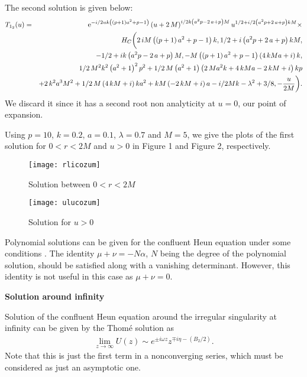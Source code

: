 \documentclass{article}
\begin{document}
The second solution is given below:
\begin{eqnarray}
T_{1_2}(u) &=&{{\rm e}^{-i/2uk \left(  \left( p+1 \right) {a}^{2}+p-1 \right) }}
 \left( u+2\,M \right) ^{i/2k \left( {a}^{2}p-2\,a+p \right) M}{u}^{1/
2+i/2 \left( {a}^{2}p+2\,a+p \right) kM} \times \\ \nonumber
&& {H_C} \bigg( 2\,iM
 \left(  \left( p+1 \right) {a}^{2}+p-1 \right) k,1/2+i \left( {a}^{2}
p+2\,a+p \right) kM, \\ \nonumber
&&-1/2+ik \left( {a}^{2}p-2\,a+p \right) M,-M
 \left(  \left( p+1 \right) {a}^{2}+p-1 \right)  \left( 4\,kMa+i
 \right) k, \\ \nonumber
&& 1/2\,{M}^{2}{k}^{2} \left( {a}^{2}+1 \right) ^{2}{p}^{2}+1/
2\,M \left( {a}^{2}+1 \right)  \left( 2\,M{a}^{2}k+4\,kMa-2\,kM+i
 \right) kp \\ \nonumber
&& +2\,{k}^{2}{a}^{3}{M}^{2}+1/2\,M \left( 4\,kM+i \right) k{a
}^{2}+kM \left( -2\,kM+i \right) a-i/2Mk-{\lambda}^{2}+3/8,-{\frac {u}{2M}} \bigg). \nonumber
\end{eqnarray}
We discard it since it has a second root non analyticity at $u=0$,
our point of expansion.

Using $p=10$, $k=0.2$, $a=0.1$, $\lambda=0.7$ and $M=5$, we give the plots of the first solution for  $0<r<2M$ and $u>0$ in Figure 1 and Figure 2,
respectively.
%
\begin{figure}[H]
\centering
\texttt{[image: rlicozum]} \caption{Solution between $0<r<2M$}
\label{fig:fig1}
\end{figure}
%
\begin{figure}[H]
\centering
\texttt{[image: ulucozum]} \caption{Solution for $u>0$}
\label{fig:fig2}
\end{figure}
%
Polynomial solutions can be given for the confluent Heun equation under some conditions \cite{Fiz2,ciftci}. The identity $\mu+\nu=-N\alpha$,
$N$ being the degree of the polynomial solution, should be satisfied along with a vanishing determinant. However, this identity is not useful
in this case as $\mu+\nu=0$.

\vspace{5pt}
\noindent \textbf{Solution around infinity}

Solution of the confluent Heun equation around the irregular singularity at infinity can be given by the Thom{\'e} solution as \cite{figu}
\begin{eqnarray}
\lim_{z\rightarrow \infty}U(z)\sim e^{\pm i\omega z}z^{\mp i\eta-(B_{2}/2)}.
\end{eqnarray}
Note that this is just the first term in a nonconverging series, which must be considered as just an asymptotic one.
\end{document}
